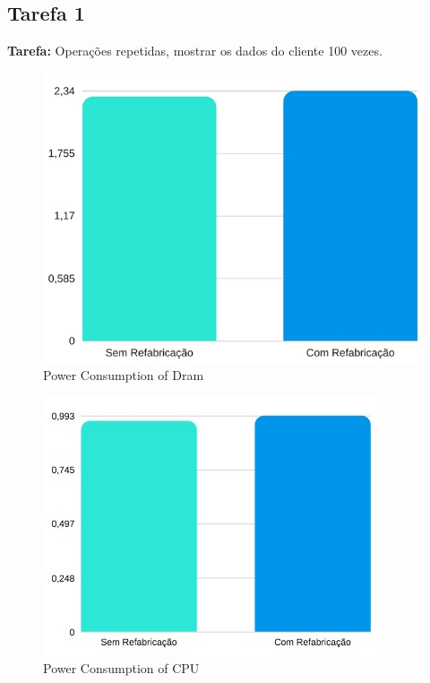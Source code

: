 \subsection{Tarefa 1}

\textbf{Tarefa:} Operações repetidas, mostrar os dados do cliente 100 vezes.

\begin{figure}[H]
    \centering
    \includegraphics[scale=0.5]{tex/img/graficos/1.jpg}
    \caption{Power Consumption of Dram}
\end{figure}

\begin{figure}[H]
    \centering
    \includegraphics[scale=0.8]{tex/img/graficos/2.jpg}
    \caption{Power Consumption of CPU}
\end{figure}

